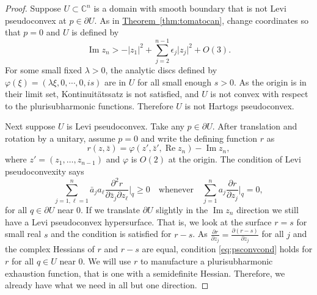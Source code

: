 \documentclass[12pt,openany]{book}
\renewcommand{\Re}{\operatorname{Re}}
\renewcommand{\Im}{\operatorname{Im}}
\newcommand{\sabs}[1]{\lvert {#1} \rvert}
\newcommand{\C}{{\mathbb{C}}}
\theoremstyle{plain}
\theoremstyle{remark}
\theoremstyle{definition}
\theoremstyle{exercise}
\theoremstyle{example}
\newcommand{\thmref}[1]{\hyperref[#1]{Theorem~\ref*{#1}}}
\begin{document}
\begin{proof}
Suppose
$U \subset \C^n$ is a domain with smooth boundary that is not
Levi pseudoconvex at $p \in \partial U$.
As in
\thmref{thm:tomatocan}, change coordinates so that $p=0$ and $U$ is defined
by
\begin{equation*}
\Im z_n > - \sabs{z_1}^2 + \sum_{j=2}^{n-1} \epsilon_j \sabs{z_j}^2 + O(3) .
\end{equation*}
For some small fixed $\lambda > 0$, the
analytic discs defined by $\varphi(\xi) = (\lambda \xi, 0, \cdots, 0, is)$
are in $U$ for all small enough $s > 0$.  As the origin
is in their limit set,
Kontinuit\"atssatz is not satisfied, and $U$ is not 
convex with respect to the plurisubharmonic functions.  Therefore 
$U$ is not Hartogs pseudoconvex.

Next suppose $U$ is Levi pseudoconvex.  Take any $p \in \partial U$.
After translation and rotation by a unitary, assume $p=0$ and
write the defining function $r$ as
\begin{equation*}
r(z,\bar{z}) = \varphi(z',\bar{z}',\Re z_n) - \Im z_n ,
\end{equation*}
where $z' = (z_1,\ldots,z_{n-1})$ and
$\varphi$ is $O(2)$ at the origin.
The condition of Levi pseudoconvexity says 
\begin{equation} \label{eq:psconvcond}
\sum_{j=1,\ell=1}^n
\bar{a}_j a_\ell \frac{\partial^2 r}{\partial \bar{z}_j \partial z_\ell} \Big|_q \geq 0 
\quad \text{whenever} \quad
\sum_{j=1}^n
a_j \frac{\partial r}{\partial z_j} \Big|_q = 0 ,
\end{equation}
for all $q \in \partial U$ near $0$.
If we translate $\partial U$ slightly in the $\Im z_n$ direction we still
have a Levi pseudoconvex hypersurface.  That is, we
look at the surface $r=s$ for small real $s$ and the condition is 
satisfied for $r-s$.  As $\frac{\partial r}{\partial z_j} =
\frac{\partial (r-s)}{\partial z_j}$ for all $j$ and the
complex Hessians of $r$ and $r-s$ are equal,
condition \eqref{eq:psconvcond} holds for $r$ for all $q \in U$ near $0$.
We will use $r$ to manufacture a plurisubharmonic exhaustion function, that
is one with a semidefinite Hessian.  Therefore, we already
have what we need in all but one direction.


\end{proof}
\end{document}
